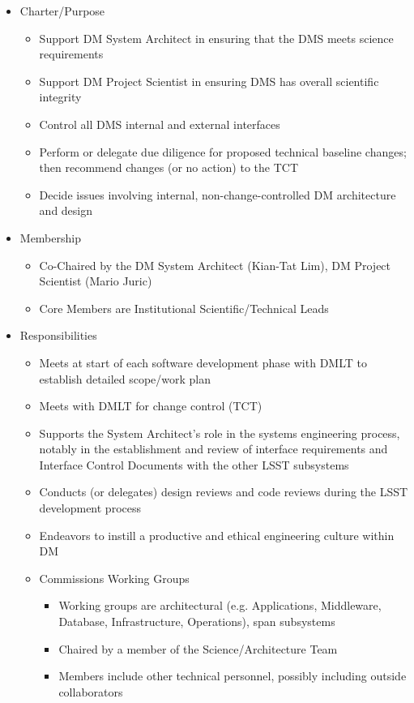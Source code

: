 \begin{itemize}
\item Charter/Purpose
\begin{itemize}
\item Support DM System Architect in ensuring that the DMS meets science requirements
\item Support DM Project Scientist in ensuring DMS has overall scientific integrity
\item Control all DMS internal and external interfaces
\item Perform or delegate due diligence for proposed technical baseline changes; then recommend changes (or no action) to the TCT
\item Decide issues involving internal, non-change-controlled DM architecture and design
\end{itemize}
\item Membership
\begin{itemize}
\item Co-Chaired by the DM System Architect (Kian-Tat Lim), DM Project Scientist (Mario Juric)
\item Core Members are Institutional Scientific/Technical Leads
\end{itemize}
\item Responsibilities
\begin{itemize}
\item Meets at start of each software development phase with DMLT to establish detailed scope/work plan
\item Meets with DMLT for change control (TCT)
\item Supports the System Architect's role in the systems engineering process, notably in the establishment and review of interface requirements and Interface Control Documents with the other LSST subsystems
\item Conducts (or delegates) design reviews and code reviews during the LSST development process
\item Endeavors to instill a productive and ethical engineering culture within DM
\item Commissions Working Groups
\begin{itemize}
\item Working groups are architectural (e.g. Applications, Middleware, Database, Infrastructure, Operations), span subsystems
\item Chaired by a member of the Science/Architecture Team
\item Members include other technical personnel, possibly including outside collaborators
\end{itemize}
\end{itemize}
\end{itemize}

